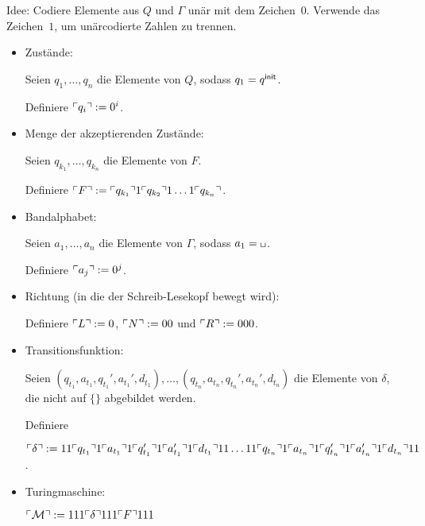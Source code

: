 Idee: Codiere Elemente aus $Q$ und $\Gamma$ unär mit dem Zeichen~$0$.
Verwende das Zeichen~$1$, um unärcodierte Zahlen zu trennen.

\begin{itemize}
 \item Zustände:
 
    Seien $q_1,\dots, q_{n}$ die Elemente von $Q$, sodass $q_1=q^\mathsf{init}$.
    
    Definiere $\ulcorner q_i \urcorner:=0^i$.
    
  \item Menge der akzeptierenden Zustände:
  
    Seien $q_{k_1},\dots, q_{k_n}$ die Elemente von $F$.
    
    Definiere $\ulcorner F \urcorner:=\ulcorner q_{k_1} \urcorner 1 \ulcorner q_{k_2} \urcorner 1 \ldots 1 \ulcorner q_{k_n} \urcorner$.
    
  \item Bandalphabet:
  
    Seien $a_1,\dots, a_{n}$ die Elemente von $\Gamma$, sodass $a_1=\blank$.
    
    Definiere $\ulcorner a_j \urcorner:=0^j$.
    
  \item Richtung (in die der Schreib-Lesekopf bewegt wird):
  
    Definiere $\ulcorner L \urcorner:=0$, $\ulcorner N \urcorner:=00$ und $\ulcorner R \urcorner:=000$.
    
  \item Transitionsfunktion:
  
   Seien $(q_{t_1}, a_{t_1}, q_{t_1}', a_{t_1}', d_{t_1}),\dots, (q_{t_n}, a_{t_n}, q_{t_n}', a_{t_n}', d_{t_n})$ 
   die Elemente von $\delta$, die nicht auf $\{\}$ abgebildet werden.
  
   Definiere
   
   $\ulcorner \delta \urcorner:= 11\ulcorner q_{t_1} \urcorner1\ulcorner a_{t_1} \urcorner1\ulcorner q_{t_1}' \urcorner1\ulcorner a_{t_1}' \urcorner1\ulcorner d_{t_1} \urcorner11\dots 11 \ulcorner q_{t_n} \urcorner1\ulcorner a_{t_n} \urcorner1\ulcorner q_{t_n}' \urcorner1 \ulcorner a_{t_n}' \urcorner1\ulcorner d_{t_n} \urcorner11$.
   
   \item Turingmaschine:
   
   $\ulcorner \mathcal{M} \urcorner:=111\ulcorner \delta \urcorner111\ulcorner F \urcorner111$
\end{itemize}


